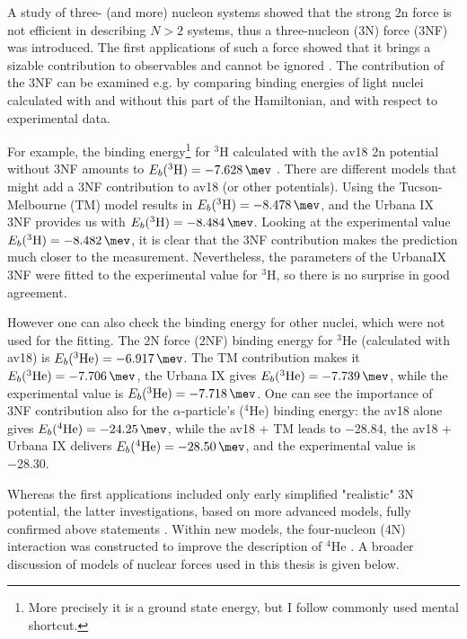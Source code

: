 A study of three- (and more) nucleon systems showed that
the strong \gls{2n} force is not efficient in describing
$N>2$ systems, thus a three-nucleon (3N) force (3NF) was introduced. The first applications of such
a force showed that it brings a
sizable contribution to observables and cannot be ignored \cite{GLOCKLE1982343}.
The contribution of the 3NF can be examined e.g. by
comparing binding energies of light nuclei calculated with
and without this part of the Hamiltonian, and with respect to experimental data.

For example, the binding energy\footnote{More precisely it is a ground state energy, but I follow commonly used mental shortcut.}
for $^3$H calculated with the \gls{av18} \gls{2n} potential 
without 3NF amounts to
$E_b(^3\mathrm{H}) = \SI{-7.628}{\mev}$ \cite{NoggaAV18}. There are different models that might add a 3NF
contribution to \gls{av18} (or other potentials). Using the Tucson-Melbourne (TM) model \cite{Tucson-Melbourne}
results in $E_b(^3\mathrm{H}) = \SI{-8.478}{\mev}$, and the Urbana IX \cite{Urbana3NF} 3NF provides us with
$E_b(^3\mathrm{H}) = \SI{-8.484}{\mev}$. Looking at the experimental value $E_b(^3\mathrm{H}) = \SI{-8.482}{\mev}$,
it is clear that the 3NF contribution makes the prediction much closer to the measurement.
Nevertheless, the parameters of the UrbanaIX
3NF were fitted to the experimental value for $^3\mathrm{H}$, so there is no surprise in good agreement.

However one can also check the binding energy for other nuclei, which were not used for the fitting.
The 2N force (2NF) binding energy for $^3$He
(calculated with \gls{av18}) is $E_b(^3\mathrm{He}) = \SI{-6.917}{\mev}$. The TM contribution makes it
$E_b(^3\mathrm{He}) = \SI{-7.706}{\mev}$, the Urbana IX gives $E_b(^3\mathrm{He}) = \SI{-7.739}{\mev}$, while the
experimental value is $E_b(^3\mathrm{He}) = \SI{-7.718}{\mev}$. One can see the importance of 3NF
contribution also for the $\alpha$-particle's ($^4\mathrm{He}$) binding energy:
the \gls{av18} alone gives
$E_b(^4\mathrm{He}) = \SI{-24.25}{\mev}$, while the \gls{av18} + TM leads to \SI{-28.84}{\mev},
the \gls{av18} + Urbana IX delivers $E_b(^4\mathrm{He}) = \SI{-28.50}{\mev}$,
and the experimental value is \SI{-28.30}{\mev}\cite{NoggaAV18}.

Whereas the first applications included only early simplified "realistic" 3N potential, the latter
investigations, based on more advanced models, fully confirmed above statements \cite{StoksPhysRevC49, AV18Wiringa}.
Within new models, the four-nucleon (4N) interaction was constructed to improve the description of
$^4\mathrm{He}$ \cite{NoggaPhysRevLett}.
A broader discussion of models of nuclear forces used in this thesis is given below.

